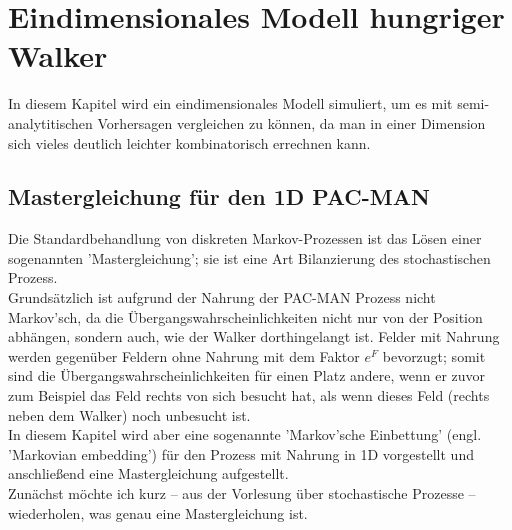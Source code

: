 \documentclass[a4paper, 12pt]{report}
\begin{document}
\chapter{Eindimensionales Modell hungriger Walker}
In diesem Kapitel wird ein eindimensionales Modell simuliert, um es mit semi-analytitischen Vorhersagen vergleichen zu können, da man in einer Dimension sich vieles deutlich leichter kombinatorisch errechnen kann.
\section{Mastergleichung für den 1D PAC-MAN}
Die Standardbehandlung von diskreten Markov-Prozessen ist das Lösen einer sogenannten 'Mastergleichung'; sie ist eine Art Bilanzierung des stochastischen Prozess.
\\
Grundsätzlich ist aufgrund der Nahrung der PAC-MAN Prozess nicht Markov'sch, da die Übergangswahrscheinlichkeiten nicht nur von der Position abhängen, sondern auch, wie der Walker dorthingelangt ist. Felder mit Nahrung werden gegenüber Feldern ohne Nahrung mit dem Faktor $e^F$ bevorzugt; somit sind die Übergangswahrscheinlichkeiten für einen Platz andere, wenn er zuvor zum Beispiel das Feld rechts von sich besucht hat, als wenn dieses Feld (rechts neben dem Walker) noch unbesucht ist.
\\
In diesem Kapitel wird aber eine sogenannte 'Markov'sche Einbettung' (engl. 'Markovian embedding') für den Prozess mit Nahrung in 1D vorgestellt und anschließend eine Mastergleichung aufgestellt.
\\
Zunächst möchte ich kurz -- aus der Vorlesung über stochastische Prozesse -- wiederholen, was genau eine Mastergleichung ist.
\end{document}

